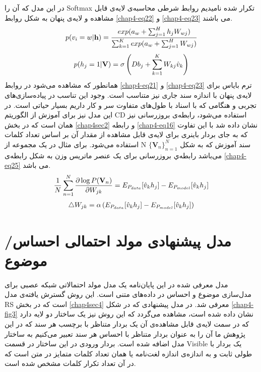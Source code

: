در این مدل که آن را
Softmax
تکرار شده نامیدیم روابط شرطی محاسبه‌ی لایه‌ی قابل مشاهده و لایه‌ی پنهان به شکل روابط
\ref{chap4-eq22}
و
\ref{chap4-eq23}
می‌ باشند.
\begin{align}
	\centering
	\label{chap4-eq22}
	p(v_{i}=w|\textbf{h})=\dfrac{exp(a_{w}+\sum_{j=1}^{H}h_jW_{wj})}{\sum_{k=1}^{K}exp(a_{w}+\sum_{j=1}^{H}W_{wj})}
\end{align}
\begin{align}
	\centering
	\label{chap4-eq23}
	p(h_{j}=1|\textbf{V})=\sigma \left( Db_j + \sum_{k=1}^{K}W_{kj}\hat{v}_k \right)
\end{align}
همانطور که مشاهده می‌‌شود در روابط
\ref{chap4-eq21}
و
\ref{chap4-eq23}
ترم بایاس برای لایه‌ی پنهان با اندازه سند جاری نیز متناسب است. وجود این تناسب در پیاده‌سازی‌های تجربی‌ و هنگامی که با اسناد با طول‌های متفاوت سر و کار داریم بسیار حیاتی است. در این مدل نیز برای آموزش از الگوریتم
CD
استفاده می‌‌شود، رابطه‌ی بروزرسانی نیز همان است که در بخش
\ref{chap4sec2}
و رابطه
\ref{chap4-eq16}
نشان داده شد با این تفاوت که به جای بردار باینری برای لایه‌ی قابل مشاهده از مقدار آن بر اساس تعداد کلمات استفاده می‌‌شود. برای مثال در یک مجموعه از
N
سند آموزش که به شکل
$\{\textbf{V}_n\}_{n=1}^{N}$
می‌باشد رابطه‌ي بروزرسانی برای یک عنصر ماتریس وزن به شکل رابطه‌ی
\ref{chap4-eq25}
می‌ باشد.
\begin{align}
	\centering
	\label{chap4-eq24}
	\dfrac{1}{N}\sum_{n=1}^{N}\dfrac{\partial\log P(\textbf{V}_n)}{\partial W_{jk}} = E_{P_{data}}[\hat{v}_kh_j]-E_{P_{model}}[\hat{v}_kh_j]
\end{align}
\begin{align}
	\centering
	\label{chap4-eq25}
	\triangle W_{jk} = \alpha \left( E_{P_{data}}[\hat{v}_kh_j]-E_{P_{model}}[\hat{v}_kh_j]  \right)
\end{align}

\section{مدل پیشنهادی مولد احتمالی احساس/موضوع}
\label{chap4sec5}



مدل معرفی‌ شده در این پایان‌‌نامه یک مدل مولد احتمالاتی شبکه عصبی برای مدل‌سازی موضوع و احساس در داده‌های متنی است. این روش گسترش یافته‌ی مدل
RS
است که در بخش
\ref{chap4sec4}
معرفی شد. در مدل پیشنهادی که در شکل
\ref{chap4-fig3}
نشان داده شده است، مشاهده می‌‌گردد که این روش نیز یک ساختار دو لایه دارد که در سمت لایه‌ی قابل مشاهده‌ی آن یک بردار متناظر با برچسب هر سند که در این پژوهش ما آن را به عنوان بردار متناظر با احساس هر سند تعبیر می‌کنیم به ساختار مدل اضافه شده است. بردار ورودی در این ساختار در قسمت
Visible
یک بردار با طولی ثابت و به اندازه‌ی اندازه لغت‌نامه یا همان تعداد کلمات متمایز در متن است که در آن تعداد تکرار کلمات مشخص شده است.

